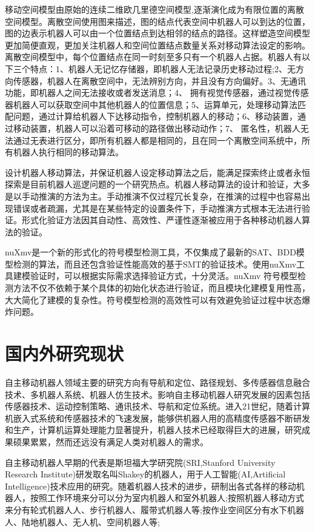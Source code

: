 移动空间模型由原始的连续二维欧几里德空间模型,逐渐演化成为有限位置的离散空间模型。离散空间使用图来描述，图的结点代表空间中机器人可以到达的位置，图的边表示机器人可以由一个位置结点到达相邻的结点的路径。这样塑造空间模型更加简便直观，更加关注机器人和空间位置结点数量关系对移动算法设定的影响。离散空间模型中，每个位置结点在同一时刻至多只有一个机器人占据。机器人有以下三个特点：1、机器人无记忆存储器，即机器人无法记录历史移动过程;2、无方向传感器，机器人在离散空间中，无法辨别方向，并且没有方向偏好。3、无通讯功能，即机器人之间无法接收或者发送消息；4、 拥有视觉传感器，通过视觉传感器机器人可以获取空间中其他机器人的位置信息；5、运算单元，处理移动算法匹配问题，通过计算给机器人下达移动指令，控制机器人的移动；6、移动装置，通过移动装置，机器人可以沿着可移动的路径做出移动动作；7、 匿名性，机器人无法通过无表进行区分，即所有机器人都是相同的，且在同一个离散空间系统中，所有机器人执行相同的移动算法。

设计机器人移动算法，并保证机器人设定移动算法之后，能满足探索终止或者永恒探索是目前机器人巡逻问题的一个研究热点。机器人移动算法的设计和验证，大多是以手动推演的方法为主。手动推演不仅过程冗长复杂，在推演的过程中也容易出现错误或者疏漏，尤其是在某些特定的设置条件下，手动推演方式根本无法进行验证。形式化验证方法因其自动性、高效性、严谨性逐渐被应用于各种移动机器人算法的验证。

nuXmv是一个新的形式化的符号模型检测工具，不仅集成了最新的SAT、BDD模型检测的算法，而且还包含验证性能高效的基于SMT的验证技术。使用nuXmv工具建模验证时，可以根据实际需求选择验证方式，十分灵活。nuXmv 符号模型检测方法不仅不依赖于某个具体的初始化状态进行验证，而且模块化建模复用性高，大大简化了建模的复杂性。符号模型检测的高效性可以有效避免验证过程中状态爆炸问题。

\section{国内外研究现状}
自主移动机器人领域主要的研究方向有导航和定位、路径规划、多传感器信息融合技术、多机器人系统、机器人仿生技术。影响自主移动机器人研究发展的因素包括传感器技术、运动控制策略、通讯技术、导航和定位系统。进入21世纪，随着计算机嵌入式系统和传感器技术的飞速发展，能够供机器人用的高精度传感器不断研发和生产，计算机运算处理能力显著提升，机器人技术已经取得巨大的进展，研究成果硕果累累，然而还远没有满足人类对机器人的需求。

自主移动机器人早期的代表是斯坦福大学研究院(SRI,Stanford University Research Institute)研发取名叫Shakey的机器人，用于人工智能(AI,Artificial Intelligence)技术应用的研究。随着机器人技术的进步，研制出各式各样的移动机器人，按照工作环境来分可以分为室内机器人和室外机器人;按照机器人移动方式来分有轮式机器人人、步行机器人、履带式机器人等;按作业空间区分有水下机器人、陆地机器人、无人机、空间机器人等;

